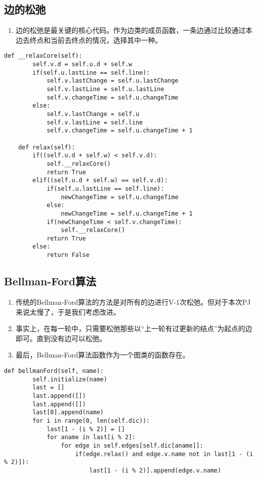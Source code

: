 \documentclass[12pt,letterpaper]{article}
\begin{document}
\subsection{边的松弛}
\begin{enumerate}
	\item 边的松弛是最关键的核心代码。作为边类的成员函数，一条边通过比较通过本边去终点和当前去终点的情况，选择其中一种。
\end{enumerate}
\begin{lstlisting}[style = Python]
    def __relaxCore(self):
        self.v.d = self.u.d + self.w
        if(self.u.lastLine == self.line):
            self.v.lastChange = self.u.lastChange
            self.v.lastLine = self.u.lastLine
            self.v.changeTime = self.u.changeTime
        else:
            self.v.lastChange = self.u
            self.v.lastLine = self.line
            self.v.changeTime = self.u.changeTime + 1

    def relax(self):
        if((self.u.d + self.w) < self.v.d):
            self.__relaxCore()
            return True
        elif((self.u.d + self.w) == self.v.d):
            if(self.u.lastLine == self.line):
                newChangeTime = self.u.changeTime
            else:
                newChangeTime = self.u.changeTime + 1
            if(newChangeTime < self.v.changeTime):
                self.__relaxCore()
            return True
        else:
            return False    
\end{lstlisting}

\subsection{Bellman-Ford算法}
\begin{enumerate}
	\item 传统的Bellman-Ford算法的方法是对所有的边进行V-1次松弛。但对于本次PJ来说太慢了，于是我们考虑改进。
	\item 事实上，在每一轮中，只需要松弛那些以“上一轮有过更新的结点”为起点的边即可。直到没有边可以松弛。
	\item 最后，Bellman-Ford算法函数作为一个图类的函数存在。
\end{enumerate}
\begin{lstlisting}[style = Python]
    def bellmanFord(self, name):
        self.initialize(name)
        last = []
        last.append([])
        last.append([])
        last[0].append(name)
        for i in range(0, len(self.dic)):
            last[1 - (i % 2)] = []
            for aname in last[i % 2]:
                for edge in self.edges[self.dic[aname]]:
                    if(edge.relax() and edge.v.name not in last[1 - (i % 2)]):
                        last[1 - (i % 2)].append(edge.v.name)   
\end{lstlisting}
\end{document}
